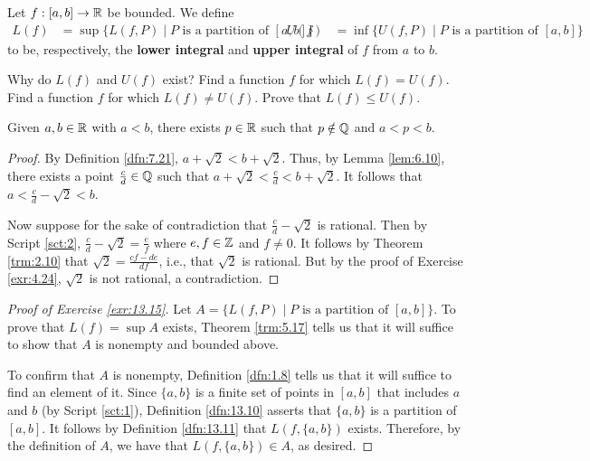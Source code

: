 \documentclass[../main.tex]{subfiles}
\begin{document}
\begin{definition}\label{dfn:13.14}
    Let $f:[a,b]\to\mathbb{R}$ be bounded. We define
    \begin{align*}
        L(f) &= \sup\{L(f,P)\mid P\text{ is a partition of }[a,b]\}&
        U(f) &= \inf\{U(f,P)\mid P\text{ is a partition of }[a,b]\}
    \end{align*}
    to be, respectively, the \textbf{lower integral} and \textbf{upper integral} of $f$ from $a$ to $b$.
\end{definition}

\begin{exercise}\label{exr:13.15}
    Why do $L(f)$ and $U(f)$ exist? Find a function $f$ for which $L(f)=U(f)$. Find a function $f$ for which $L(f)\neq U(f)$. Prove that $L(f)\leq U(f)$.
    \begin{lemma*}
        Given $a,b\in\mathbb{R}$ with $a<b$, there exists $p\in\mathbb{R}$ such that $p\notin\mathbb{Q}$ and $a<p<b$.
        \begin{proof}
            By Definition \ref{dfn:7.21}, $a+\sqrt{2}<b+\sqrt{2}$. Thus, by Lemma \ref{lem:6.10}, there exists a point $\frac{c}{d}\in\mathbb{Q}$ such that $a+\sqrt{2}<\frac{c}{d}<b+\sqrt{2}$. It follows that $a<\frac{c}{d}-\sqrt{2}<b$.\par
            Now suppose for the sake of contradiction that $\frac{c}{d}-\sqrt{2}$ is rational. Then by Script \ref{sct:2}, $\frac{c}{d}-\sqrt{2}=\frac{e}{f}$ where $e,f\in\mathbb{Z}$ and $f\neq 0$. It follows by Theorem \ref{trm:2.10} that $\sqrt{2}=\frac{cf-de}{df}$, i.e., that $\sqrt{2}$ is rational. But by the proof of Exercise \ref{exr:4.24}, $\sqrt{2}$ is not rational, a contradiction.
        \end{proof}
    \end{lemma*}
    \begin{proof}[Proof of Exercise \ref{exr:13.15}]
        Let $A=\{L(f,P)\mid P\text{ is a partition of }[a,b]\}$. To prove that $L(f)=\sup A$ exists, Theorem \ref{trm:5.17} tells us that it will suffice to show that $A$ is nonempty and bounded above.\par
        To confirm that $A$ is nonempty, Definition \ref{dfn:1.8} tells us that it will suffice to find an element of it. Since $\{a,b\}$ is a finite set of points in $[a,b]$ that includes $a$ and $b$ (by Script \ref{sct:1}), Definition \ref{dfn:13.10} asserts that $\{a,b\}$ is a partition of $[a,b]$. It follows by Definition \ref{dfn:13.11} that $L(f,\{a,b\})$ exists. Therefore, by the definition of $A$, we have that $L(f,\{a,b\})\in A$, as desired.\par

\end{proof}
\end{exercise}
\end{document}
